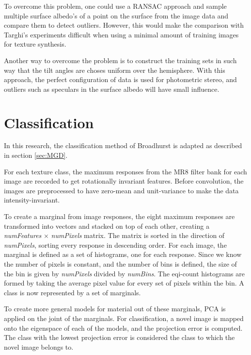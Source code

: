 To overcome this problem, one could use a RANSAC approach and sample multiple surface albedo's of a point on the surface from the image data and compare them to detect outliers. However, this would make the comparison with Targhi's experiments difficult when using a minimal amount of training images for texture synthesis.

Another way to overcome the problem is to construct the training sets in such way that the tilt angles are choses uniform over the hemisphere. With this approach, the perfect configuration of data is used for photometric stereo, and outliers such as speculars in the surface albedo will have small influence.

\section{Classification}\label{sec:Classification}

In this research, the classification method of Broadhurst is adapted as described in section \ref{sec:MGD}. 

For each texture class, the maximum responses from the MR8 filter bank for each image are recorded to get rotationally invariant features. Before convolution, the images are preprocessed to have zero-mean and unit-variance to make the data intensity-invariant.

To create a marginal from image responses, the eight maximum responses are transformed into vectors and stacked on top of each other, creating a {\it numFeatures} $\times$ {\it numPixels} matrix. The matrix is sorted in the direction of {\it numPixels}, sorting every response in descending order. For each image, the marginal is defined as a set of histograms, one for each response. Since we know the number of pixels is constant, and the number of bins is defined, the size of the bin is given by {\it numPixels} divided by {\it numBins}. The eqi-count histograms are formed by taking the average pixel value for every set of pixels within the bin. A class is now represented by a set of marginals.

To create more general models for material out of these marginals, PCA is applied on the joint of the marginals. For classification, a novel image is mapped onto the eigenspace of each of the models, and the projection error is computed. The class with the lowest projection error is considered the class to which the novel image belongs to. 

